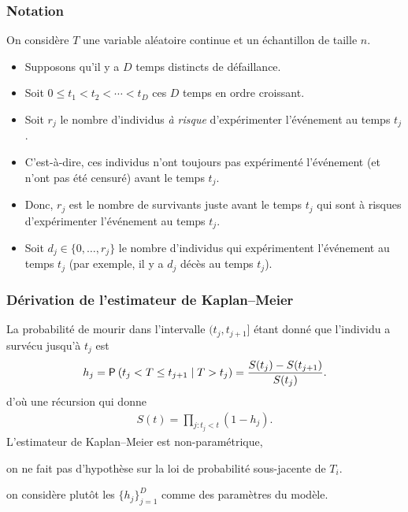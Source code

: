 \documentclass{beamer}
\begin{document}
\begin{frame}
\frametitle{Notation}
On considère $T$ une variable aléatoire continue et un échantillon de taille $n$.
\begin{itemize}
\item Supposons qu'il y a $D$ temps distincts de défaillance. 
\item Soit $0 \leq t_1 < t_2 < \cdots < t_D$ ces $D$ temps en ordre croissant. 
\item Soit $r_j$ le nombre d'individus \emph{à risque} d'expérimenter l'événement au temps $t_j$. 
\bi
\item C'est-à-dire, ces individus n'ont toujours pas expérimenté l'événement (et n'ont pas été censuré) avant le temps $t_j$. 
\item Donc, $r_j$ est le nombre de survivants juste avant le temps $t_j$ qui sont à risques d'expérimenter l'événement au temps $t_j$.
\ei
\item Soit $d_j \in \{0, \ldots, r_j\}$ le nombre d'individus qui expérimentent l'événement au temps $t_j$ (par exemple, il y a $d_j$ décès au temps $t_j$). 
\end{itemize}
\end{frame}
\begin{frame}
\frametitle{Dérivation de l'estimateur de Kaplan--Meier}
 La probabilité de mourir dans l'intervalle $(t_j, t_{j+1}]$ étant donné que l'individu a survécu jusqu'à $t_j$ est 
 \begin{align*}
  h_j = \P{t_j < T \leq t_{j+1} \mid T > t_j} 
  = \frac{S(t_j) - S(t_{j+1})}{S(t_j)}.
 \end{align*}
d'où une récursion qui donne \begin{align*}
S(t) = \prod_{j: t_j < t} (1-h_j).
\end{align*}
L'estimateur de Kaplan--Meier  est \alert{non-paramétrique}, 
\bi \item on ne fait pas d'hypothèse sur la loi de probabilité sous-jacente de  $T_i$.
\item on considère plutôt les $\{h_j\}_{j=1}^D$ comme des paramètres du modèle.
\ei
\end{frame}
\end{document}
